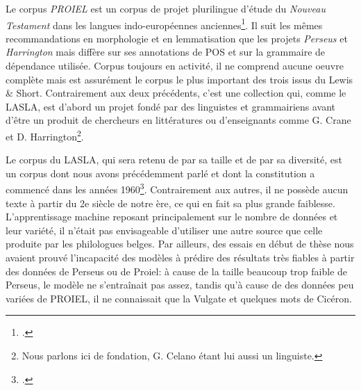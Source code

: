 Le corpus \textit{PROIEL} est un corpus de projet plurilingue d'étude du \textit{Nouveau Testament} dans les langues indo-européennes anciennes\footcite{haug_creating_2008}. Il suit les mêmes recommandations en morphologie et en lemmatisation que les projets \textit{Perseus} et \textit{Harrington} mais diffère sur ses annotations de POS et sur la grammaire de dépendance utilisée. Corpus toujours en activité, il ne comprend aucune oeuvre complète mais est assurément le corpus le plus important des trois issus du Lewis \& Short. Contrairement aux deux précédents, c'est une collection qui, comme le LASLA, est d'abord un projet fondé par des linguistes et grammairiens avant d'être un produit de chercheurs en littératures ou d'enseignants comme G. Crane et D. Harrington\footnote{Nous parlons ici de fondation, G. Celano étant lui aussi un linguiste.}.

\begin{table}[h]
\centering
{}
\caption{Résumé des informations sur les quatre corpus disponibles. Il existe 137 oeuvres au sens du LASLA, mais certaines sont des des découpes inhabituelles, nous préférons donc la notation 100+ ici.}
\label{tab:lemmatisation:corpus-entrainement}
\end{table}

Le corpus du LASLA, qui sera retenu de par sa taille et de par sa diversité, est un corpus dont nous avons précédemment parlé et dont la constitution a commencé dans les années 1960\footcites{delatte_laboratoire_1961}{BodsonCodification1966}. Contrairement aux autres, il ne possède aucun texte à partir du 2e siècle de notre ère, ce qui en fait sa plus grande faiblesse. L'apprentissage machine reposant principalement sur le nombre de données et leur variété, il n'était pas envisageable d'utiliser une autre source que celle produite par les philologues belges. Par ailleurs, des essais en début de thèse nous avaient prouvé l'incapacité des modèles à prédire des résultats très fiables à partir des données de Perseus ou de Proiel: à cause de la taille beaucoup trop faible de Perseus, le modèle ne s'entraînait pas assez, tandis qu'à cause de des données peu variées de PROIEL, il ne connaissait que la Vulgate et quelques mots de Cicéron.

